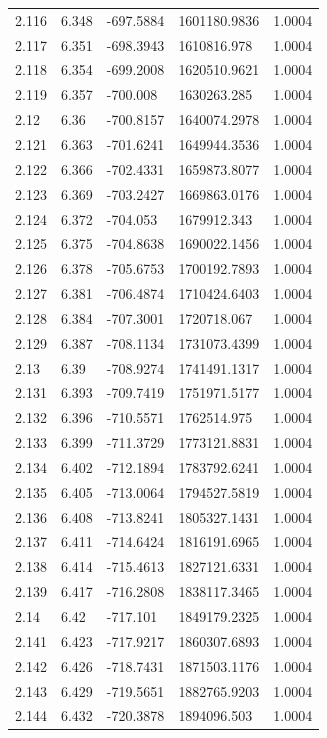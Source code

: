 \begin{tabular}{lllll}
2.116 & 6.348 & -697.5884 & 1601180.9836 & 1.0004 \\
2.117 & 6.351 & -698.3943 & 1610816.978 & 1.0004 \\
2.118 & 6.354 & -699.2008 & 1620510.9621 & 1.0004 \\
2.119 & 6.357 & -700.008 & 1630263.285 & 1.0004 \\
2.12 & 6.36 & -700.8157 & 1640074.2978 & 1.0004 \\
2.121 & 6.363 & -701.6241 & 1649944.3536 & 1.0004 \\
2.122 & 6.366 & -702.4331 & 1659873.8077 & 1.0004 \\
2.123 & 6.369 & -703.2427 & 1669863.0176 & 1.0004 \\
2.124 & 6.372 & -704.053 & 1679912.343 & 1.0004 \\
2.125 & 6.375 & -704.8638 & 1690022.1456 & 1.0004 \\
2.126 & 6.378 & -705.6753 & 1700192.7893 & 1.0004 \\
2.127 & 6.381 & -706.4874 & 1710424.6403 & 1.0004 \\
2.128 & 6.384 & -707.3001 & 1720718.067 & 1.0004 \\
2.129 & 6.387 & -708.1134 & 1731073.4399 & 1.0004 \\
2.13 & 6.39 & -708.9274 & 1741491.1317 & 1.0004 \\
2.131 & 6.393 & -709.7419 & 1751971.5177 & 1.0004 \\
2.132 & 6.396 & -710.5571 & 1762514.975 & 1.0004 \\
2.133 & 6.399 & -711.3729 & 1773121.8831 & 1.0004 \\
2.134 & 6.402 & -712.1894 & 1783792.6241 & 1.0004 \\
2.135 & 6.405 & -713.0064 & 1794527.5819 & 1.0004 \\
2.136 & 6.408 & -713.8241 & 1805327.1431 & 1.0004 \\
2.137 & 6.411 & -714.6424 & 1816191.6965 & 1.0004 \\
2.138 & 6.414 & -715.4613 & 1827121.6331 & 1.0004 \\
2.139 & 6.417 & -716.2808 & 1838117.3465 & 1.0004 \\
2.14 & 6.42 & -717.101 & 1849179.2325 & 1.0004 \\
2.141 & 6.423 & -717.9217 & 1860307.6893 & 1.0004 \\
2.142 & 6.426 & -718.7431 & 1871503.1176 & 1.0004 \\
2.143 & 6.429 & -719.5651 & 1882765.9203 & 1.0004 \\
2.144 & 6.432 & -720.3878 & 1894096.503 & 1.0004 \\

\end{tabular}
